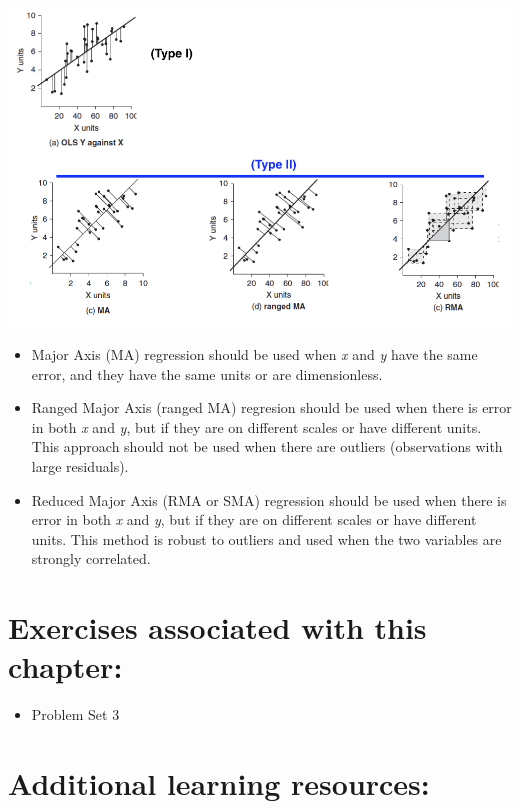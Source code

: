 \documentclass[]{book}
\providecommand{\tightlist}{%
  \setlength{\itemsep}{0pt}\setlength{\parskip}{0pt}}
\begin{document}
\begin{center}\includegraphics[width=13.89in]{images/images_5a.002} \end{center}

\begin{itemize}
\item
  Major Axis (MA) regression should be used when \emph{x} and \emph{y} have the same error, and they have the same units or are dimensionless.
\item
  Ranged Major Axis (ranged MA) regresion should be used when there is error in both \emph{x} and \emph{y}, but if they are on different scales or have different units. This approach should not be used when there are outliers (observations with large residuals).
\item
  Reduced Major Axis (RMA or SMA) regression should be used when there is error in both \emph{x} and \emph{y}, but if they are on different scales or have different units. This method is robust to outliers and used when the two variables are strongly correlated.
\end{itemize}

\hypertarget{exercises-associated-with-this-chapter-7}{%
\section{Exercises associated with this chapter:}\label{exercises-associated-with-this-chapter-7}}

\begin{itemize}
\tightlist
\item
  Problem Set 3
\end{itemize}

\hypertarget{additional-learning-resources-7}{%
\section{Additional learning resources:}\label{additional-learning-resources-7}}
\end{document}
